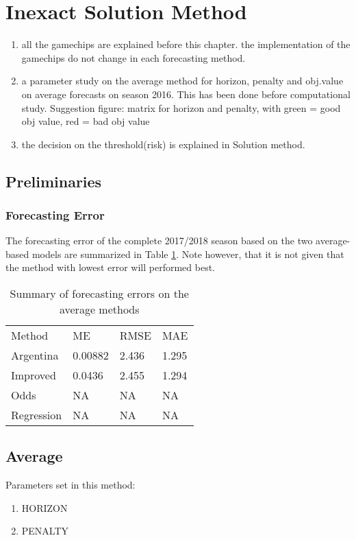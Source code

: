 \section{Inexact Solution Method}\label{sec:inexact}
\begin{enumerate}
    \item all the gamechips are explained before this chapter. the implementation of the gamechips do not change in each forecasting method. 
    \item a parameter study on the average method for horizon, penalty and obj.value on average forecasts on season 2016. This has been done before computational study. Suggestion figure: matrix for horizon and penalty, with green = good obj value, red = bad obj value
    \item  the decision on the threshold(risk) is explained in Solution method. 
\end{enumerate}

\subsection{Preliminaries}
\subsubsection{Forecasting Error}
The forecasting error of the complete 2017/2018 season based on the two average-based models are summarized in Table \ref{tab:accuracy_average}. Note however, that it is not given that the method with lowest error will performed best. 

\begin{table}[H]
\centering
\caption{Summary of forecasting errors on the average methods}
\label{tab:accuracy_average}
\begin{tabular}{llll}
Method & ME & RMSE & MAE\\
Argentina & 0.00882 & 2.436 & 1.295 \\
Improved  & 0.0436  & 2.455 & 1.294 \\ 
Odds  & NA  & NA & NA   \\
Regression  & NA  & NA & NA \\
\end{tabular}
\end{table}


\subsection{Average}

Parameters set in this method: 
\begin{enumerate}
    \item HORIZON 
    \item PENALTY
\end{enumerate}

